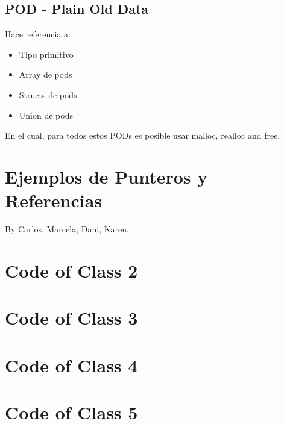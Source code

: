 \documentclass[11pt,letterpaper]{article}
\begin{document}
\subsection{POD - Plain Old Data}
Hace referencia a:
\begin{itemize}
    \item Tipo primitivo
    \item Array de pods
    \item Structs de pods
    \item Union de pods
\end{itemize}
En el cual, para todos estos PODs es posible usar malloc, realloc and free.

\newpage
\appendix
\section{Ejemplos de Punteros y Referencias }
By Carlos, Marcela, Dani, Karen.


\section{Code of Class 2}


\section{Code of Class 3}


\section{Code of Class 4}


\section{Code of Class 5}

\end{document}
